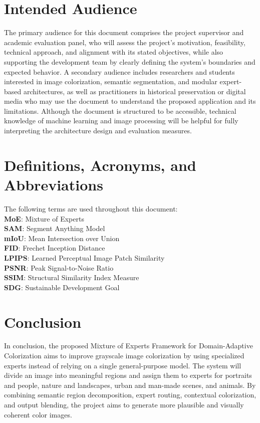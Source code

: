 \documentclass{FastFyp}
\begin{document}
\section{Intended Audience}
The primary audience for this document comprises the project supervisor and academic evaluation panel, who will assess the project's motivation, feasibility, technical approach, and alignment with its stated objectives, while also supporting the development team by clearly defining the system's boundaries and expected behavior. A secondary audience includes researchers and students interested in image colorization, semantic segmentation, and modular expert-based architectures, as well as practitioners in historical preservation or digital media who may use the document to understand the proposed application and its limitations. Although the document is structured to be accessible, technical knowledge of machine learning and image processing will be helpful for fully interpreting the architecture design and evaluation measures.
\section{Definitions, Acronyms, and Abbreviations}
The following terms are used throughout this document:\\
\textbf{MoE}: Mixture of Experts\\
\textbf{SAM}: Segment Anything Model\\
\textbf{mIoU}: Mean Intersection over Union\\
\textbf{FID}: Frechet Inception Distance\\
\textbf{LPIPS}: Learned Perceptual Image Patch Similarity\\
\textbf{PSNR}: Peak Signal-to-Noise Ratio\\
\textbf{SSIM}: Structural Similarity Index Measure\\
\textbf{SDG}: Sustainable Development Goal
\section{Conclusion}
In conclusion, the proposed Mixture of Experts Framework for Domain-Adaptive Colorization aims to improve grayscale image colorization by using specialized experts instead of relying on a single general-purpose model. The system will divide an image into meaningful regions and assign them to experts for portraits and people, nature and landscapes, urban and man-made scenes, and animals. By combining semantic region decomposition, expert routing, contextual colorization, and output blending, the project aims to generate more plausible and visually coherent color images.
\end{document}
